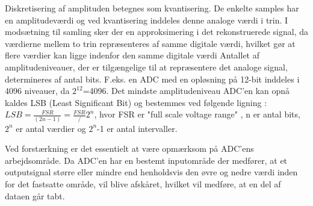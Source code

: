 Diskretisering af amplituden betegnes som kvantisering. De enkelte samples har en amplitudeværdi og ved kvantisering inddeles denne analoge værdi i trin. I modsætning til samling sker der en approksimering i det rekonstruerede signal, da værdierne mellem to trin repræsenteres af samme digitale værdi, hvilket gør at flere værdier kan ligge indenfor den samme digitale værdi \cite{Zouridakis2003} Antallet af amplitudeniveauer, der er tilgængelige til at repræsentere det analoge signal, determineres af antal bits. F.eks. en ADC med en opløsning på 12-bit inddeles i 4096 niveauer, da $2^12$=4096. \cite{Konrad2006} Det mindste amplitudeniveau ADC'en kan opnå kaldes LSB (Least Significant Bit) og bestemmes ved følgende ligning : 
$LSB = \frac{FSR}{(2n-1)} = \frac{FSR}/{2^n}$, hvor FSR er "full scale voltage range" , n er antal bits, $2^n$ er antal værdier og $2^n$-1 er antal intervaller. 

Ved forstærkning er det essentielt at være opmærksom på ADC'ens  arbejdsområde. 
Da ADC'en har en bestemt inputområde der medfører, at et outputsignal større eller mindre end
henholdsvis den øvre og nedre værdi inden for det fastsatte område, vil blive afskåret, hvilket
vil medføre, at en del af dataen går tabt.
 




 